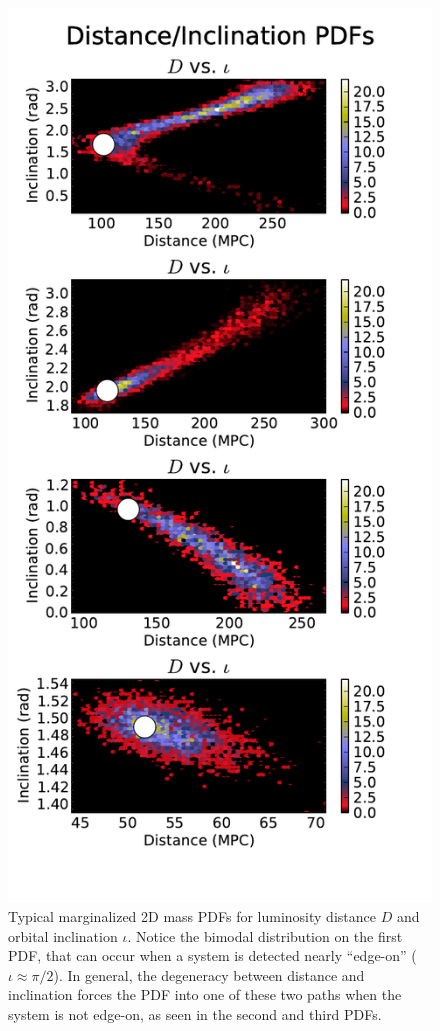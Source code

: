 \documentclass[11pt,a4paper]{emulateapj} 
\begin{document}
   
\begin{figure}[h!]
  \centering \includegraphics[trim=0cm 0cm 0cm 0cm,
    clip=true,scale=0.75]{distIota2D.pdf}
 \caption{Typical marginalized 2D mass PDFs for luminosity distance
   $D$ and orbital inclination $\iota$. Notice the bimodal
   distribution on the first PDF, that can occur when a system is
   detected nearly ``edge-on'' ($\iota \approx \pi/2$).  In general,
   the degeneracy between distance and inclination forces the PDF into
   one of these two paths when the system is not edge-on, as seen in
   the second and third PDFs.}
 \label{distIotaPDF}
\end{figure}
\end{document}
